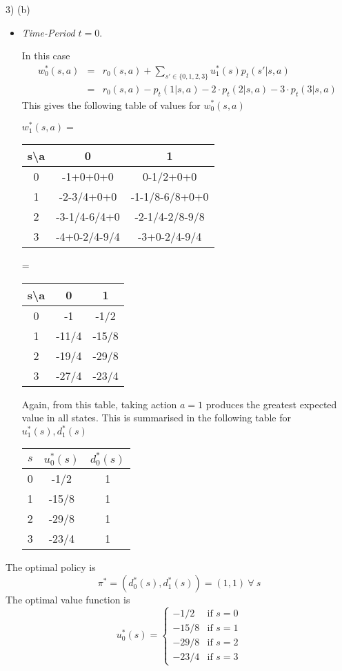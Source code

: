 \documentclass[11pt,a4paper]{article}
\begin{document}
\begin{answer}{3) (b)}
\begin{itemize}
    \item \textit{Time-Period} $t=0$.
    \par In this case
    \[\begin{array}{rcl}
      w_0^*(s,a)&=&r_0(s,a)+\sum_{s'\in\{0,1,2,3\}}u_1^*(s)p_t(s'|s,a)\\
      &=&r_0(s,a)-p_t(1|s,a)-2\cdot p_t(2|s,a)-3\cdot p_t(3|s,a)
    \end{array}\]
    This gives the following table of values for $w_0^*(s,a)$
    \begin{center}
      $w_1^*(s,a)=$
      \begin{tabular}{c|cc}
        s\textbackslash a&0&1\\\hline
        0&-1+0+0+0&0-1/2+0+0\\
        1&-2-3/4+0+0&-1-1/8-6/8+0+0\\
        2&-3-1/4-6/4+0&-2-1/4-2/8-9/8\\
        3&-4+0-2/4-9/4&-3+0-2/4-9/4&
      \end{tabular}
      =
      \begin{tabular}{c|cc}
        s\textbackslash a&0&1\\\hline
        0&-1&-1/2\\
        1&-11/4&-15/8\\
        2&-19/4&-29/8\\
        3&-27/4&-23/4
      \end{tabular}
    \end{center}
    Again, from this table, taking action $a=1$ produces the greatest expected value in all states. This is summarised in the following table for $u_1^*(s),d_1^*(s)$
    \begin{center}
      \begin{tabular}{c|c|c}
        $s$&$u_0^*(s)$&$d_0^*(s)$\\\hline
        0&-1/2&1\\
        1&-15/8&1\\
        2&-29/8&1\\
        3&-23/4&1
      \end{tabular}
    \end{center}
  \end{itemize}
  The optimal policy is
  \[ \pi^*=(d_0^*(s),d_1^*(s))=(1,1)\ \forall\ s \]
  The optimal value function is
  \[ u_0^*(s)=\begin{cases}
                -1/2&\text{if }s=0\\
                -15/8&\text{if }s=1\\
                -29/8&\text{if }s=2\\
                -23/4&\text{if }s=3
              \end{cases} \]
\end{answer}
\end{document}
